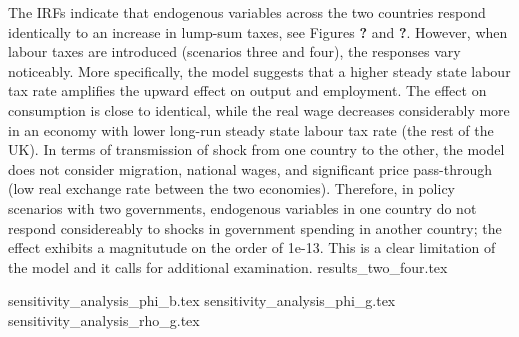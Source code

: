 The IRFs indicate that endogenous variables across the two countries respond identically to an increase in lump-sum taxes, see Figures \textbf{?} and \textbf{?}. However, when labour taxes are introduced (scenarios three and four), the responses vary noticeably. More specifically, the model suggests that a higher steady state labour tax rate amplifies the upward effect on output and employment. The effect on consumption is close to identical, while the real wage decreases considerably more in an economy with lower long-run steady state labour tax rate (the rest of the UK). 
In terms of transmission of shock from one country to the other, the model does not consider migration, national wages, and significant price pass-through (low real exchange rate between the two economies). Therefore, in policy scenarios with two governments, endogenous variables in one country do not respond considereably to shocks in government spending in another country; the effect exhibits a magnitutude on the order of 1e-13. This is a clear limitation of the model and it calls for additional examination.
{results_two_four.tex}

\newpage
{sensitivity_analysis_phi_b.tex}
\newpage
{sensitivity_analysis_phi_g.tex}
\newpage
{sensitivity_analysis_rho_g.tex}

    